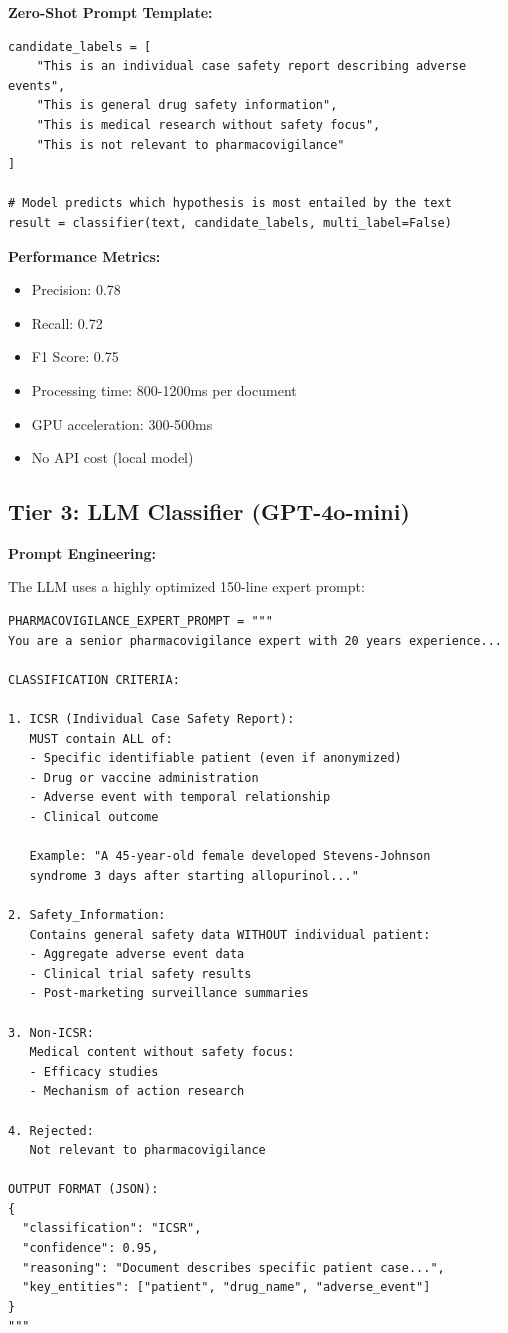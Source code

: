 \textbf{Zero-Shot Prompt Template:}
\begin{lstlisting}[style=pythonstyle]
candidate_labels = [
    "This is an individual case safety report describing adverse events",
    "This is general drug safety information",
    "This is medical research without safety focus",
    "This is not relevant to pharmacovigilance"
]

# Model predicts which hypothesis is most entailed by the text
result = classifier(text, candidate_labels, multi_label=False)
\end{lstlisting}

\textbf{Performance Metrics:}
\begin{itemize}
    \item Precision: 0.78
    \item Recall: 0.72
    \item F1 Score: 0.75
    \item Processing time: 800-1200ms per document
    \item GPU acceleration: 300-500ms
    \item No API cost (local model)
\end{itemize}

\subsection{Tier 3: LLM Classifier (GPT-4o-mini)}

\textbf{Prompt Engineering:}

The LLM uses a highly optimized 150-line expert prompt:

\begin{lstlisting}[style=pythonstyle]
PHARMACOVIGILANCE_EXPERT_PROMPT = """
You are a senior pharmacovigilance expert with 20 years experience...

CLASSIFICATION CRITERIA:

1. ICSR (Individual Case Safety Report):
   MUST contain ALL of:
   - Specific identifiable patient (even if anonymized)
   - Drug or vaccine administration
   - Adverse event with temporal relationship
   - Clinical outcome
   
   Example: "A 45-year-old female developed Stevens-Johnson 
   syndrome 3 days after starting allopurinol..."

2. Safety_Information:
   Contains general safety data WITHOUT individual patient:
   - Aggregate adverse event data
   - Clinical trial safety results
   - Post-marketing surveillance summaries
   
3. Non-ICSR:
   Medical content without safety focus:
   - Efficacy studies
   - Mechanism of action research
   
4. Rejected:
   Not relevant to pharmacovigilance

OUTPUT FORMAT (JSON):
{
  "classification": "ICSR",
  "confidence": 0.95,
  "reasoning": "Document describes specific patient case...",
  "key_entities": ["patient", "drug_name", "adverse_event"]
}
"""
\end{lstlisting}

